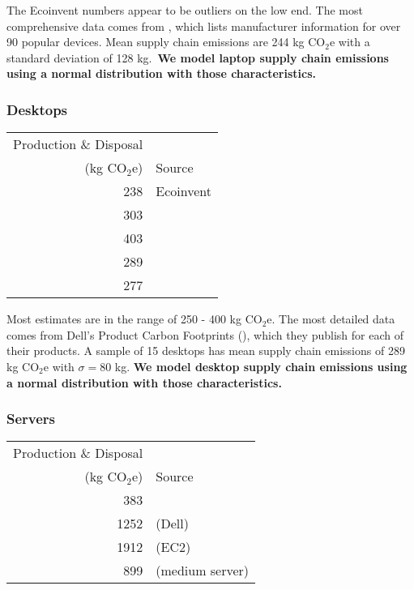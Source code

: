 \documentclass[11pt]{article}
\newcommand{\assumption}[1]{{\bf #1}}
\begin{document}
The Ecoinvent numbers appear to be outliers on the low end.
The most comprehensive data comes from \textcite{rarecoil}, which lists manufacturer
information for over 90 popular devices. Mean supply chain emissions are
244 kg CO$_2$e with a standard deviation of 128 kg.\
\assumption{We model laptop supply chain emissions using a normal distribution with those characteristics.}

\subsubsection*{Desktops}

\begin{center}
\begin{tabular}{|r|l|}
\hline
Production \& Disposal & \\
(kg CO$_2$e) & Source \\ \hline
238 & Ecoinvent \\ \hline
303 & \textcite{teehan2013} \\ \hline
403 & \textcite{unctadder2024} \\ \hline
289 & \textcite{dellpcf} \\ \hline
277 & \textcite{boavizta} \\ \hline
\end{tabular}
\label{tab:embodied_emissions:desktops}
\end{center}

Most estimates are in the range of 250 - 400 kg CO$_2$e. The most detailed data comes from
Dell's Product Carbon Footprints (\textcite{dellpcf}), which they publish for each of their products.
A sample of 15 desktops has mean supply chain emissions of 289 kg CO$_2$e with $\sigma = 80$ kg.
\assumption{We model desktop supply chain emissions using a normal distribution with those characteristics.}

\subsubsection*{Servers}

\begin{center}
\begin{tabular}{|r|l|}
\hline
Production \& Disposal & \\
(kg CO$_2$e) & Source \\ \hline
383 & \textcite{teehan2013} \\ \hline
1252 & \textcite{davy2021} (Dell) \\ \hline
1912 & \textcite{davy2021} (EC2) \\ \hline
899 & \textcite{boavizta} (medium server)\\ \hline
\end{tabular}
\label{tab:embodied_emissions:servers}
\end{center}
\end{document}
